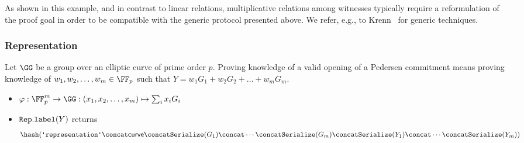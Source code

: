 \documentclass[11pt]{article}
\begin{document}
As shown in this example, and in contrast to linear relations, multiplicative relations among witnesses typically require a reformulation of the proof goal in order to be compatible with the generic protocol presented above.
We refer, e.g., to Krenn~\cite{krenn12} for generic techniques.


\subsubsection{Representation}
Let $\GG$ be a group over an elliptic curve of prime order $p$.
Proving knowledge of a valid opening of a Pedersen commitment means proving knowledge of $w_1,w_2, \dots, w_m\in\FF_p$ such that $Y=w_1G_1 + w_2G_2 + \dots + w_m G_m$.


\begin{itemize}
  \item $\varphi:\FF_p^m\to\GG:(x_1,x_2, \dots, x_m)\mapsto \sum_i x_iG_i$
  \item $\texttt{Rep}.\texttt{label}(Y)$ returns
  \[
    \hash(\replabel \concat \curvectx \concat \serialize(G_1) \concat \cdots \concat \serialize(G_m) \concat \serialize(Y_1) \concat \cdots \concat \serialize(Y_m))
  \]
\end{itemize}
\end{document}
